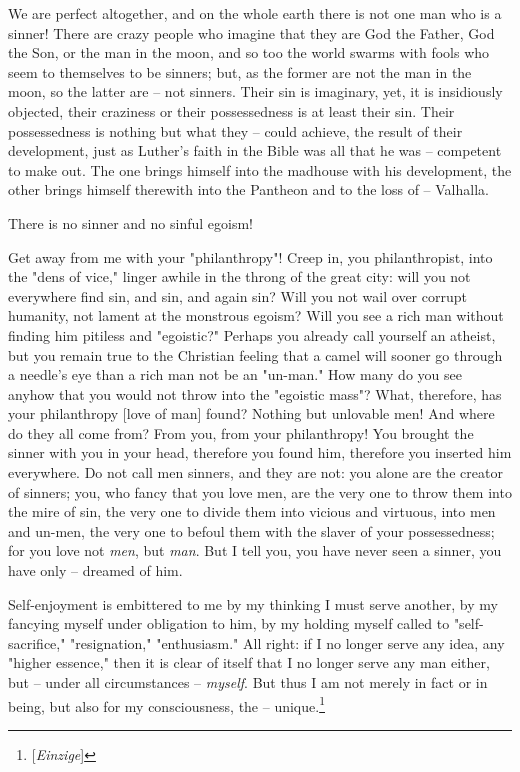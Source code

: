 \documentclass[a4paper]{book}
\begin{document}
We are perfect altogether, and on the whole earth there is not one man who is 
a sinner! There are crazy people who imagine that they are God the Father, God 
the Son, or the man in the moon, and so too the world swarms with fools who 
seem to themselves to be sinners; but, as the former are not the man in the 
moon, so the latter are -- not sinners. Their sin is imaginary, yet, it is 
insidiously objected, their craziness or their possessedness is at least their 
sin. Their possessedness is nothing but what they -- could achieve, the result 
of their development, just as Luther's faith in the Bible was all that he was 
-- competent to make out. The one brings himself into the madhouse with his 
development, the other brings himself therewith into the Pantheon and to the 
loss of -- Valhalla.

There is no sinner and no sinful egoism!

Get away from me with your "{}philanthropy"{}! Creep in, you philanthropist, 
into the "{}dens of vice,"{} linger awhile in the throng of the great city: 
will you not everywhere find sin, and sin, and again sin? Will you not wail 
over corrupt humanity, not lament at the monstrous egoism? Will you see a rich 
man without finding him pitiless and "{}egoistic?"{} Perhaps you already call 
yourself an atheist, but you remain true to the Christian feeling that a camel 
will sooner go through a needle's eye than a rich man not be an "{}un-man."{} 
How many do you see anyhow that you would not throw into the "{}egoistic 
mass"{}? What, therefore, has your philanthropy [love of man] found? Nothing 
but unlovable men! And where do they all come from? From you, from your 
philanthropy! You brought the sinner with you in your head, therefore you 
found him, therefore you inserted him everywhere. Do not call men sinners, and 
they are not: you alone are the creator of sinners; you, who fancy that you 
love men, are the very one to throw them into the mire of sin, the very one to 
divide them into vicious and virtuous, into men and un-men, the very one to 
befoul them with the slaver of your possessedness; for you love not 
\textit{men}, but \textit{man}. But I tell you, you have never seen a sinner, 
you have only -- dreamed of him.

Self-enjoyment is embittered to me by my thinking I must serve another, by my 
fancying myself under obligation to him, by my holding myself called to 
"{}self-sacrifice,"{} "{}resignation,"{} "{}enthusiasm."{} All right: if I no 
longer serve any idea, any "{}higher essence,"{} then it is clear of itself 
that I no longer serve any man either, but -- under all circumstances -- 
\textit{myself}. But thus I am not merely in fact or in being, but also for my 
consciousness, the -- unique.\footnote{[\textit{Einzige}]}
\end{document}
